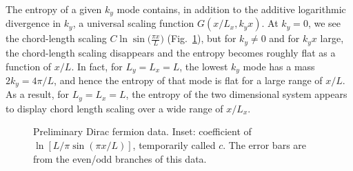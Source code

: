 \documentclass[prl,aps,twocolumn,floatfix,amsmath,amssymb,superscriptaddress,tightenlines]{revtex4}
\begin{document}
The entropy of a given $k_y$ mode contains, in addition to the additive logarithmic divergence in $k_y$, a universal scaling function $G(x/L_x,k_y x)$.  At $k_y=0$, we see the chord-length scaling $C \ln\sin\big( \frac{\pi x}{L} \big)$ (Fig.~\ref{fig:dirac}), but for $k_y \neq 0$ and for $k_y x$ large, the chord-length scaling disappears and the entropy becomes roughly flat as a function of $x/L$.  In fact, for $L_y=L_x=L$, the lowest $k_y$ mode has a mass $2 k_y=4\pi/L$, and hence the entropy of that mode is flat for a large range of $x/L$.  As a result, for $L_y=L_x=L$, the entropy of the two dimensional system appears to display chord length scaling over a wide range of $x/L_x$.

 \begin{figure}[ht]
   \begin{center}
   \end{center}
   \caption{Preliminary Dirac fermion data. Inset: coefficient of $\ln\left[ L/\pi \sin( \pi x/L ) \right]$, temporarily called $c$. The error bars are from the even/odd branches of this data.}
   \label{fig:dirac}
 \end{figure}
 
\end{document}
